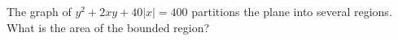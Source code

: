 The graph of $y^2+2xy+40|x|=400$ partitions the plane into several regions.  What is the area of the bounded region?